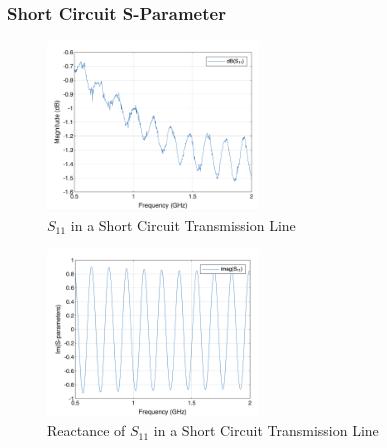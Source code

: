 \documentclass{article} %
\begin{document}
\subsubsection*{Short Circuit S-Parameter}
\begin{figure}[H]
    \centering
    \includegraphics[width=0.5\textwidth]{./image/figure4.png}
    \caption{$S_{11}$ in a Short Circuit Transmission Line}
\end{figure}
\begin{figure}[H]
    \centering
    \includegraphics[width=0.5\textwidth]{./image/figure5.png}
    \caption{Reactance of $S_{11}$ in a Short Circuit Transmission Line}
\end{figure}
\end{document}

